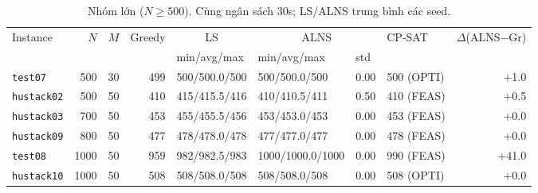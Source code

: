 \begin{table}[H]
\centering\small
\caption{Nhóm lớn ($N\ge 500$). Cùng ngân sách $30$s; LS/ALNS trung bình các seed.}
\label{tab:bench-large}
\begin{tabular}{lrr r l ll l r}
\toprule
\multirow{2}{*}{Instance} & \multirow{2}{*}{$N$} & \multirow{2}{*}{$M$}
& \multirow{2}{*}{Greedy}
& \multicolumn{1}{c}{LS} & \multicolumn{2}{c}{ALNS} & \multirow{2}{*}{CP-SAT}
& \multirow{2}{*}{$\Delta$(ALNS$-$Gr)} \\
\cmidrule(lr){5-5}\cmidrule(lr){6-7}
& & & & min/avg/max & min/avg/max & std & & \\
\midrule
\texttt{test07} & 500 & 30 & 499 & 500/500.0/500 & 500/500.0/500 & 0.00 & 500 (OPTI) & +1.0 \\
\texttt{hustack02} & 500 & 50 & 410 & 415/415.5/416 & 410/410.5/411 & 0.50 & 410 (FEAS) & +0.5 \\
\texttt{hustack03} & 700 & 50 & 453 & 455/455.5/456 & 453/453.0/453 & 0.00 & 453 (FEAS) & +0.0 \\
\texttt{hustack09} & 800 & 50 & 477 & 478/478.0/478 & 477/477.0/477 & 0.00 & 478 (FEAS) & +0.0 \\
\texttt{test08} & 1000 & 50 & 959 & 982/982.5/983 & 1000/1000.0/1000 & 0.00 & 990 (FEAS) & +41.0 \\
\texttt{hustack10} & 1000 & 50 & 508 & 508/508.0/508 & 508/508.0/508 & 0.00 & 508 (OPTI) & +0.0 \\
\bottomrule
\end{tabular}
\end{table}
